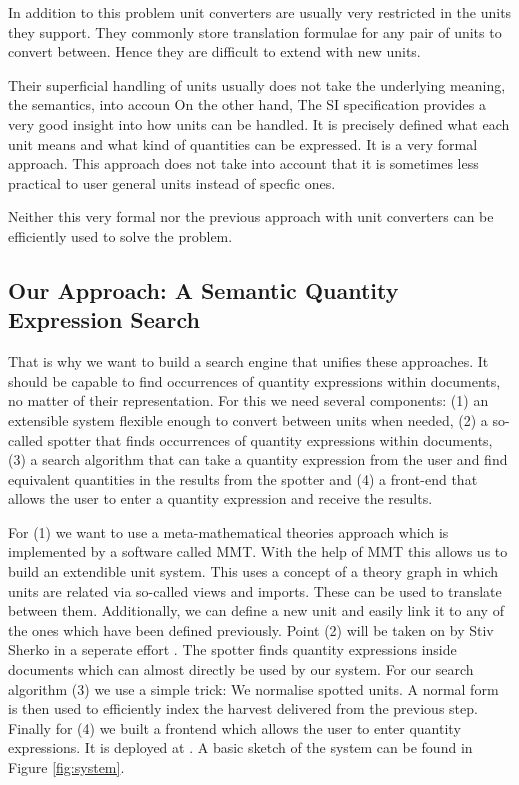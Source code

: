 In addition to this problem unit converters are usually very restricted in the units they support. They commonly store translation formulae for any pair of units to convert between. Hence they are difficult to extend with new units.

Their superficial handling of units usually does not take the underlying meaning, the semantics, into accoun On the other hand, The SI specification \cite{sispec} provides a very good insight into how units can be handled. It is precisely defined what each unit means and what kind of quantities can be expressed. It is a very formal approach. This approach does not take into account that it is sometimes less practical to user general units instead of specfic ones.

Neither this very formal nor the previous approach with unit converters can be efficiently used to solve the problem.

\subsection{Our Approach: A Semantic Quantity Expression Search}

That is why we want to build a search engine that unifies these approaches. It should be capable to find occurrences of quantity expressions within documents, no matter of their representation. For this we need several components: (1) an extensible system flexible enough to convert between units when needed, (2) a so-called spotter that finds occurrences of quantity expressions within documents, (3) a search algorithm that can take a quantity expression from the user and find equivalent quantities in the results from the spotter and (4) a front-end that allows the user to enter a quantity expression and receive the results.

For (1) we want to use a meta-mathematical theories approach which is implemented by a software called MMT. With the help of MMT this allows us to build an extendible unit system. This uses a concept of a theory graph in which units are related via so-called views and imports. These can be used to translate between them. Additionally, we can define a new unit and easily link it to any of the ones which have been defined previously. Point (2) will be taken on by Stiv Sherko in a seperate effort \cite{thesis:sharko}. The spotter finds quantity expressions inside documents which can almost directly be used by our system. For our search algorithm (3) we use a simple trick: We normalise spotted units. A normal form is then used to efficiently index the harvest delivered from the previous step. Finally for (4) we built a frontend which allows the user to enter quantity expressions. It is deployed at \cite{self:sqesdemo}. A basic sketch of the system can be found in Figure \ref{fig:system}.

